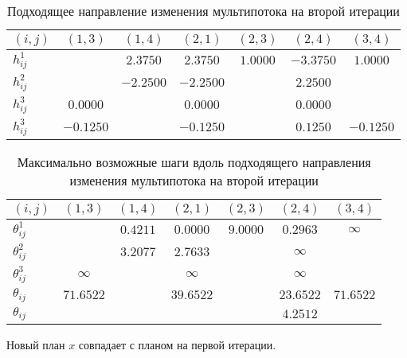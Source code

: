 \documentclass[a4paper,14pt,usenames,dvipsnames]{extreport}
\begin{document}
\begin{table}[H] 
\renewcommand{\arraystretch}{1.3}
\caption{Подходящее направление изменения мультипотока на второй итерации} \label{tab:t11}
\begin{center}
\begin{tabular}{|l|c|c|c|c|c|c|}
\hline$(i, j)$ & $(1,3)$ & $(1,4)$ & $(2,1)$ & $(2,3)$ & $(2,4)$ & $(3,4)$ \\
\hline$h_{i j}^{1}$ & & $2.3750$ & $2.3750$ & $1.0000$ & $-3.3750$ & $1.0000$\\
\hline$h_{i j}^{2}$ & & $-2.2500$ & $-2.2500$ & & $2.2500$ &  \\
\hline$h_{i j}^{3}$ & $0.0000$ & & $0.0000$ & & $0.0000$ &  \\
\hline$h_{i j}^{3}$ & $-0.1250$ & & $-0.1250$ & & $0.1250$ & $-0.1250$ \\
\hline
\end{tabular}
\end{center}
\end{table}

\begin{table}[H] 
\renewcommand{\arraystretch}{1.3}
\caption{Максимально возможные шаги вдоль подходящего направления изменения мультипотока на второй итерации} \label{tab:t11}
\begin{center}
\begin{tabular}{|l|c|c|c|c|c|c|}
\hline$(i, j)$ & $(1,3)$ & $(1,4)$ & $(2,1)$ & $(2,3)$ & $(2,4)$ & $(3,4)$ \\
\hline$\theta_{i j}^{1}$ & & $0.4211$ & $0.0000$ & $9.0000$ & $0.2963$ & $\infty$\\
\hline$\theta_{i j}^{2}$ & & $3.2077$ & $2.7633$ & & $\infty$ & \\
\hline$\theta_{i j}^{3}$ & $\infty$ & & $\infty$ & & $\infty$ & \\
\hline$\theta_{i j}$ & $71.6522$ & & $39.6522$ & & $23.6522$ & $71.6522$ \\
\hline$\theta_{i j}$ & & & & & $4.2512$ & \\
\hline
\end{tabular}
\end{center}
\end{table}

Новый план $x$ совпадает с планом на первой итерации.
\end{document}
